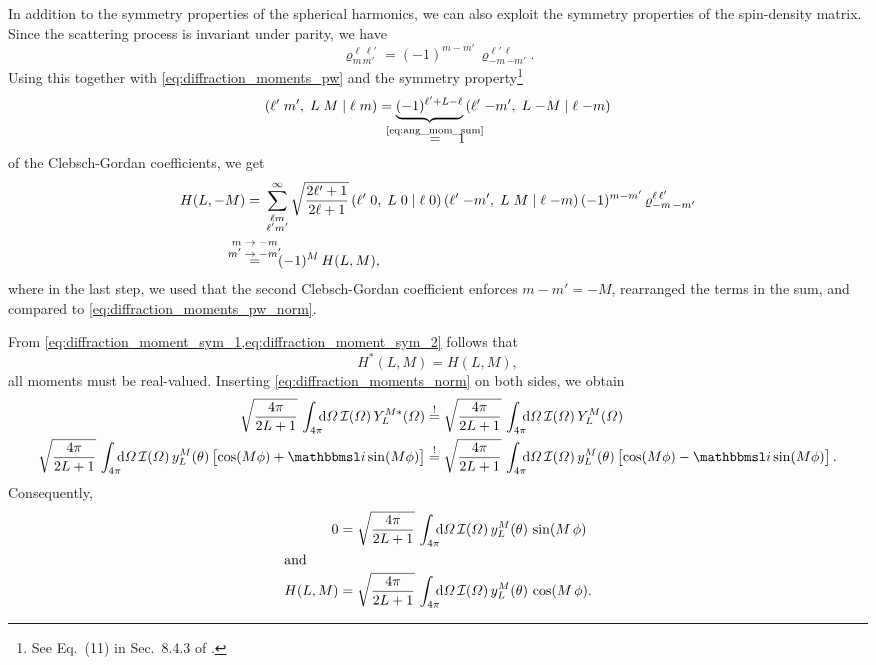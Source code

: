 In addition to the symmetry properties of the spherical harmonics, we
can also exploit the symmetry properties of the spin-density matrix.
Since the scattering process is invariant under parity, we have
\begin{equation}
  \label{eq:diffraction_spin_dens_parity}
  \varrho^{\ell\, \ell'}_{m\, m'}
  = (-1)^{m - m'}\, \varrho^{\ell'\, \ell}_{{-m}\, {-m'}}.
\end{equation}
Using this together with \cref{eq:diffraction_moments_pw} and the
symmetry property\footnote{See Eq.~(11) in Sec.~8.4.3 of
.}
\begin{equation}
  \label{eq:clebsch_sym2}
  \clebsch{\ell'}{m'}{L}{M}{\ell}{m}
  = \rdUnderbrace{(-1)^{\ell' + L - \ell}}{\equalUsing{$\mathclap{\text{\cref{eq:ang_mom_sum}}}$}\quad 1}\,
  \clebsch{\ell'}{-m'}{L}{-M}{\ell}{-m}
\end{equation}
of the Clebsch-Gordan coefficients, we get
\begin{align}
  H(L, -M)
  ={}& \sum_{\substack{\ell m \\ \ell' m'}}^\infty
  \sqrt{\frac{2 \ell' + 1}{2 \ell + 1}}\,
  \clebsch{\ell'}{0}{L}{0}{\ell}{0}\, \clebsch{\ell'}{-m'}{L}{M}{\ell}{-m}\,
  (-1)^{m - m'}\, \varrho^{\ell\, \ell'}_{{-m}\, {-m}'} \notag
  \\
  \label{eq:diffraction_moment_sym_2}
  \equalUsing{$\mathclap{\substack{\displaystyle{m \to -m} \\ \displaystyle{m' \to -m'}}}$}{}& \quad
  (-1)^M\, H(L, M),
\end{align}
where in the last step, we used that the second Clebsch-Gordan
coefficient enforces $m - m' = -M$, rearranged the terms in the sum,
and compared to \cref{eq:diffraction_moments_pw_norm}.

From \cref{eq:diffraction_moment_sym_1,eq:diffraction_moment_sym_2} follows that
\begin{equation}
  H^*(L, M) = H(L, M),
\end{equation}
\ie all moments must be real-valued.  Inserting
\cref{eq:diffraction_moments_norm} on both sides, we obtain
\begin{align}
  \sqrt{\frac{4 \pi}{2 L + 1}}\, \int_{4 \pi}\!\!\! \dif{\Omega}\, \mathcal{I}(\Omega)\, Y_L^{M *}(\Omega)
  \mustBeEq{}&
  \sqrt{\frac{4 \pi}{2 L + 1}}\, \int_{4 \pi}\!\!\! \dif{\Omega}\, \mathcal{I}(\Omega)\, Y_L^M(\Omega) \\
  \sqrt{\frac{4 \pi}{2 L + 1}}\, \int_{4 \pi}\!\!\! \dif{\Omega}\, \mathcal{I}(\Omega)\, y_L^M(\theta) \sBrk{\cos(M \phi) + \imag \sin(M \phi)}
  \mustBeEq{}&
  \sqrt{\frac{4 \pi}{2 L + 1}}\, \int_{4 \pi}\!\!\! \dif{\Omega}\, \mathcal{I}(\Omega)\, y_L^M(\theta) \sBrk{\cos(M \phi) - \imag \sin(M \phi)}.
\end{align}
Consequently,
\begin{align}
  \label{eq:diffraction_moments_imag}
  0
  ={}& \sqrt{\frac{4 \pi}{2 L + 1}}\, \int_{4 \pi}\!\!\! \dif{\Omega}\, \mathcal{I}(\Omega)\, y_L^M(\theta)\, \sin(M\, \phi) \\
  \intertext{and}
  \label{eq:diffraction_moments_real}
  H(L, M)
  ={}& \sqrt{\frac{4 \pi}{2 L + 1}}\, \int_{4 \pi}\!\!\! \dif{\Omega}\, \mathcal{I}(\Omega)\, y_L^M(\theta)\, \cos(M\, \phi).
\end{align}

